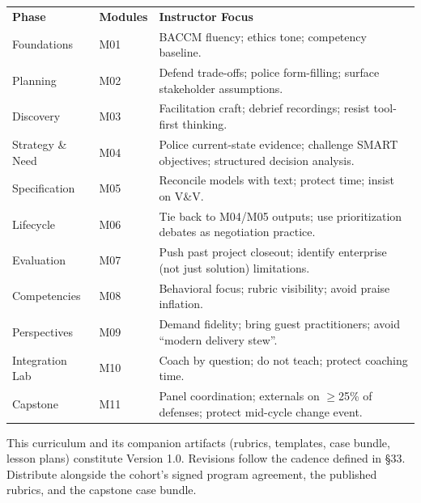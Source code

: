 \documentclass[11pt,letterpaper,oneside]{report}
\begin{document}
\renewcommand{\arraystretch}{1.18}
\begin{tabularx}{\linewidth}{@{}R{2.4cm} R{3.4cm} >{\RaggedRight\arraybackslash}X@{}}
\\
\toprule
\sffamily\bfseries Phase & \sffamily\bfseries Modules & \sffamily\bfseries Instructor Focus \\
\midrule
Foundations         & M01            & BACCM fluency; ethics tone; competency baseline.\\
Planning            & M02            & Defend trade-offs; police form-filling; surface stakeholder assumptions.\\
Discovery           & M03            & Facilitation craft; debrief recordings; resist tool-first thinking.\\
Strategy \& Need    & M04            & Police current-state evidence; challenge SMART objectives; structured decision analysis.\\
Specification       & M05            & Reconcile models with text; protect time; insist on V\&V.\\
Lifecycle           & M06            & Tie back to M04/M05 outputs; use prioritization debates as negotiation practice.\\
Evaluation          & M07            & Push past project closeout; identify enterprise (not just solution) limitations.\\
Competencies        & M08            & Behavioral focus; rubric visibility; avoid praise inflation.\\
Perspectives        & M09            & Demand fidelity; bring guest practitioners; avoid ``modern delivery stew''.\\
Integration Lab     & M10            & Coach by question; do not teach; protect coaching time.\\
Capstone            & M11            & Panel coordination; externals on $\geq$25\% of defenses; protect mid-cycle change event.\\
\bottomrule
\end{tabularx}

\vfill
\begin{infobox}
This curriculum and its companion artifacts (rubrics, templates, case bundle, lesson plans) constitute Version 1.0. Revisions follow the cadence defined in \S33. Distribute alongside the cohort's signed program agreement, the published rubrics, and the capstone case bundle.
\end{infobox}
\end{document}
